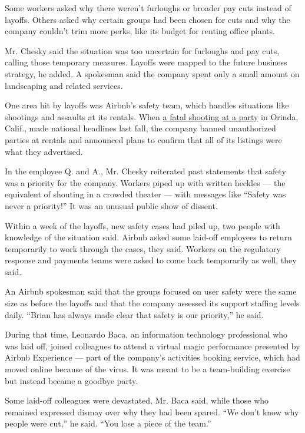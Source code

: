 Some workers asked why there weren't furloughs or broader pay cuts
instead of layoffs. Others asked why certain groups had been chosen for
cuts and why the company couldn't trim more perks, like its budget for
renting office plants.

Mr. Chesky said the situation was too uncertain for furloughs and pay
cuts, calling those temporary measures. Layoffs were mapped to the
future business strategy, he added. A spokesman said the company spent
only a small amount on landscaping and related services.

One area hit by layoffs was Airbnb's safety team, which handles
situations like shootings and assaults at its rentals. When
\href{https://www.nytimes.com/2019/11/01/us/orinda-shooting.html}{a
fatal shooting at a party} in Orinda, Calif., made national headlines
last fall, the company banned unauthorized parties at rentals and
announced plans to confirm that all of its listings were what they
advertised.

In the employee Q. and A., Mr. Chesky reiterated past statements that
safety was a priority for the company. Workers piped up with written
heckles --- the equivalent of shouting in a crowded theater --- with
messages like ``Safety was never a priority!'' It was an unusual public
show of dissent.

Within a week of the layoffs, new safety cases had piled up, two people
with knowledge of the situation said. Airbnb asked some laid-off
employees to return temporarily to work through the cases, they said.
Workers on the regulatory response and payments teams were asked to come
back temporarily as well, they said.

An Airbnb spokesman said that the groups focused on user safety were the
same size as before the layoffs and that the company assessed its
support staffing levels daily. ``Brian has always made clear that safety
is our priority,'' he said.

During that time, Leonardo Baca, an information technology professional
who was laid off, joined colleagues to attend a virtual magic
performance presented by Airbnb Experience --- part of the company's
activities booking service, which had moved online because of the virus.
It was meant to be a team-building exercise but instead became a goodbye
party.

Some laid-off colleagues were devastated, Mr. Baca said, while those who
remained expressed dismay over why they had been spared. ``We don't know
why people were cut,'' he said. ``You lose a piece of the team.''

